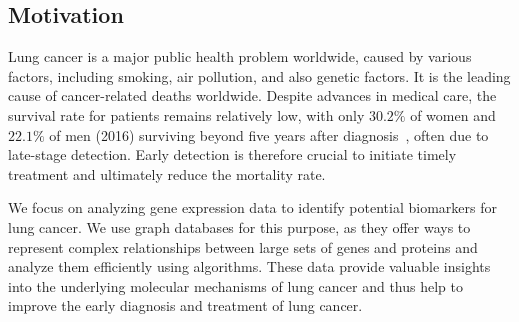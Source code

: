 \subsection{Motivation} \label{subsec:motivation}

Lung cancer is a major public health problem worldwide, caused by various factors,
including smoking, air pollution, and also genetic factors.
It is the leading cause of cancer-related deaths worldwide\cite{ferlay2024global}.
Despite advances in medical care, the survival rate for patients remains relatively low,
with only $30.2\%$ of women and $22.1\%$ of men (2016)
surviving beyond five years after diagnosis~\cite{seer2024explorer}, often due to late-stage detection.
Early detection is therefore crucial to initiate timely treatment and ultimately reduce the mortality rate.

We focus on analyzing gene expression data to identify potential biomarkers for lung cancer.
We use graph databases for this purpose,
as they offer ways to represent complex relationships between large sets of genes and proteins
and analyze them efficiently using algorithms.
These data provide valuable insights into the underlying molecular mechanisms of lung cancer
and thus help to improve the early diagnosis and treatment of lung cancer.